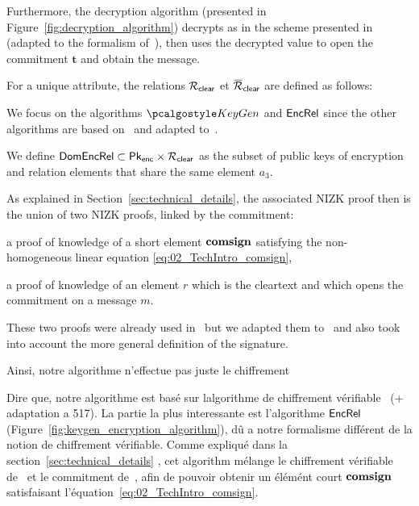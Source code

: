 
Furthermore, the decryption algorithm (presented in 
Figure~\ref{fig:decryption_algorithm}) decrypts as in the scheme 
presented in~\cite{EC:LyuNev17} (adapted to the formalism 
of~\cite{C:AttLyuSei20}), then uses the decrypted value to open the commitment
$\mathbf{t}$ and obtain the message.

For a unique attribute, the relations $\mathcal{R}_{\mathsf{clear}}$ et 
$\barrelationclear$ are defined as follows:

We focus on the algorithms $\KeyGen$ and $\mathsf{EncRel}$ since the other algorithms
are based on~\cite{EC:LyuNev17} and adapted to~\cite{C:AttLyuSei20}.

We define $\mathsf{DomEncRel} \subset \mathsf{Pk}_{\mathsf{enc}} \times \mathcal{R}_{\mathsf{clear}}$ 
as the subset of public keys of encryption and relation elements that 
share the same element $a_3$.



As explained in Section~\ref{sec:technical_details}, the associated NIZK 
proof then is the union of two NIZK proofs, linked by the commitment:

\begin{compactitem}

	\item a proof of knowledge of a short element
$\mathbf{comsign}$ satisfying the non-homogeneous linear equation
\eqref{eq:02_TechIntro_comsign},

	\item a proof of knowledge of an element $r$ which is the cleartext
and which opens the commitment on a message $m$.

\end{compactitem}
These two proofs were already used in~\cite{CCS:delLyuSei18} but we adapted 
them to~\cite{C:AttLyuSei20} and also took into account the more general
definition of the signature.

\iffalse
Ainsi, notre algorithme n'effectue pas juste le chiffrement 

Dire que, notre algorithme est basé sur lalgorithme  de chiffrement vérifiable~\cite{EC:LyuNev17} (+
adaptation a 517). La partie la plus interessante est l'algorithme $\mathsf{EncRel}$
(Figure~\ref{fig:keygen_encryption_algorithm}), dû a notre formalisme
différent de la notion de chiffrement vérifiable. 
Comme expliqué dans la section~\ref{sec:technical_details} , cet
algorithm mélange le chiffrement vérifiable de~\cite{EC:LyuNev17} et le commitment
de~\cite{CCS:delLyuSei18}, afin de pouvoir obtenir un élémént court $\mathbf{comsign}$
satisfaisant l'équation~\eqref{eq:02_TechIntro_comsign}. 

